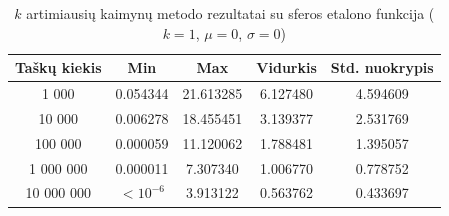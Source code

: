 \begin{table}[H]
    \centering
    \begin{tabular}{|c|c|c|c|c|}
        \hline
        \textbf{Taškų kiekis} & \textbf{Min} & \textbf{Max} & \textbf{Vidurkis} & \textbf{Std. nuokrypis} \\ \hline
        1 000        & 0.054344 & 21.613285 & 6.127480 & 4.594609 \\ \hline
        10 000       & 0.006278 & 18.455451 & 3.139377 & 2.531769 \\ \hline
        100 000      & 0.000059 & 11.120062 & 1.788481 & 1.395057 \\ \hline
        1 000 000    & 0.000011 & 7.307340 & 1.006770 & 0.778752 \\ \hline
        10 000 000   & $<10^{-6}$ & 3.913122 & 0.563762 & 0.433697 \\ \hline
    \end{tabular}
    \caption{$k$ artimiausių kaimynų metodo rezultatai su sferos etalono funkcija ($k = 1$, $\mu = 0$, $\sigma = 0$)}
\end{table}